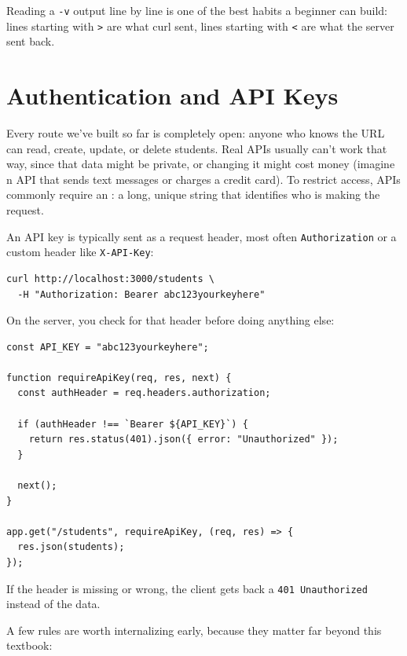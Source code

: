 Reading a \texttt{-v} output line by line is one of the best habits a
beginner can build: lines starting with \texttt{>} are what curl sent,
lines starting with \texttt{<} are what the server sent back.

\section{Authentication and API Keys}

Every route we've built so far is completely open: anyone who knows
the URL can read, create, update, or delete students. Real APIs
usually can't work that way, since that data might be private, or
changing it might cost money (imagine n API that sends text messages
or charges a credit card). To restrict access, APIs commonly require
an : a long, unique string that identifies who is
making the request.

An API key is typically sent as a request header, most often
\texttt{Authorization} or a custom header like \texttt{X-API-Key}:

\begin{verbatim}
curl http://localhost:3000/students \
  -H "Authorization: Bearer abc123yourkeyhere"
\end{verbatim}

On the server, you check for that header before doing anything else:

\begin{verbatim}
const API_KEY = "abc123yourkeyhere";
 
function requireApiKey(req, res, next) {
  const authHeader = req.headers.authorization;
 
  if (authHeader !== `Bearer ${API_KEY}`) {
    return res.status(401).json({ error: "Unauthorized" });
  }
 
  next();
}
 
app.get("/students", requireApiKey, (req, res) => {
  res.json(students);
});
\end{verbatim}

If the header is missing or wrong, the client gets back a
\texttt{401 Unauthorized} instead of the data.

A few rules are worth internalizing early, because they matter far
beyond this textbook:

